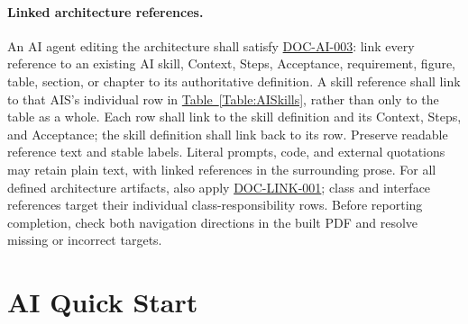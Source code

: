 \paragraph{Linked architecture references.}\label{Rule:AIReferenceLinks}
An AI agent editing the architecture shall satisfy
\hyperref[Requirement:DOCAI003]{DOC-AI-003}: link every reference to an
existing AI skill, Context, Steps, Acceptance, requirement, figure, table,
section, or chapter to its authoritative definition. A skill reference
shall link to that AIS's individual row in
\hyperref[Table:AISkills]{Table~\ref{Table:AISkills}}, rather than
only to the table as a whole. Each row shall link to the skill definition and
its Context, Steps, and Acceptance; the skill definition shall link back to
its row. Preserve readable reference text and stable labels. Literal prompts,
code, and external quotations may retain plain text, with linked references
in the surrounding prose. For all defined architecture artifacts, also apply \hyperref[Requirement:DOCLINK001]{DOC-LINK-001}; class and interface references target their individual class-responsibility rows. Before reporting completion, check both navigation
directions in the built PDF and resolve missing or incorrect targets.

\section{AI Quick Start}
\label{Section:AIQuickStart}

